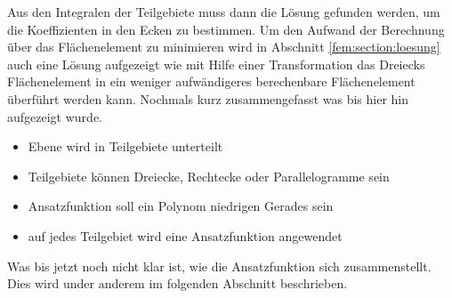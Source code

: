 Aus den Integralen der Teilgebiete muss dann die Lösung gefunden werden, um die Koeffizienten in den Ecken zu bestimmen. Um den Aufwand der Berechnung über das Flächenelement zu minimieren wird in Abschnitt \ref{fem:section:loesung} auch eine Lösung aufgezeigt wie mit Hilfe einer Transformation das Dreiecks Flächenelement in ein weniger aufwändigeres berechenbare Flächenelement überführt werden kann.
Nochmals kurz zusammengefasst was bis hier hin aufgezeigt wurde.
\begin{itemize}
	\item Ebene wird in Teilgebiete unterteilt
	\item Teilgebiete können Dreiecke, Rechtecke oder Parallelogramme sein
	\item Ansatzfunktion soll ein Polynom niedrigen Gerades sein
	\item auf jedes Teilgebiet wird eine Ansatzfunktion angewendet
\end{itemize} 
Was bis jetzt noch nicht klar ist, wie die Ansatzfunktion sich zusammenstellt. Dies wird under anderem im folgenden Abschnitt beschrieben.





